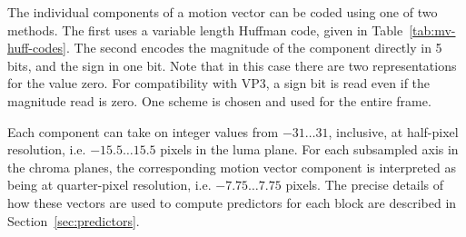 \documentclass[9pt,letterpaper]{book}
\numberwithin{equation}{chapter}
\numberwithin{figure}{chapter}
\numberwithin{table}{chapter}
\begin{document}
The individual components of a motion vector can be coded using one of two
 methods.
The first uses a variable length Huffman code, given in
 Table~\ref{tab:mv-huff-codes}.
The second encodes the magnitude of the component directly in 5 bits, and the
 sign in one bit.
Note that in this case there are two representations for the value zero.
For compatibility with VP3, a sign bit is read even if the magnitude read is
 zero.
One scheme is chosen and used for the entire frame.

Each component can take on integer values from $-31\ldots 31$, inclusive, at
 half-pixel resolution, i.e. $-15.5\ldots 15.5$ pixels in the luma plane.
For each subsampled axis in the chroma planes, the corresponding motion vector
 component is interpreted as being at quarter-pixel resolution, i.e.
 $-7.75\ldots 7.75$ pixels.
The precise details of how these vectors are used to compute predictors for
 each block are described in Section~\ref{sec:predictors}.
\end{document}
